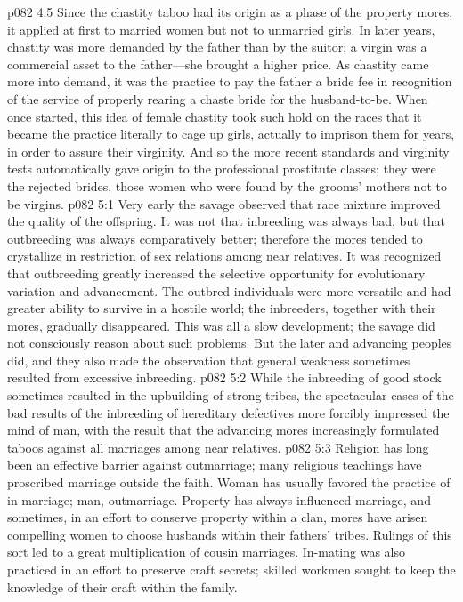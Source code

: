 \vs p082 4:5 Since the chastity taboo had its origin as a phase of the property mores, it applied at first to married women but not to unmarried girls. In later years, chastity was more demanded by the father than by the suitor; a virgin was a commercial asset to the father---she brought a higher price. As chastity came more into demand, it was the practice to pay the father a bride fee in recognition of the service of properly rearing a chaste bride for the husband\hyp{}to\hyp{}be. When once started, this idea of female chastity took such hold on the races that it became the practice literally to cage up girls, actually to imprison them for years, in order to assure their virginity. And so the more recent standards and virginity tests automatically gave origin to the professional prostitute classes; they were the rejected brides, those women who were found by the grooms’ mothers not to be virgins.
\vs p082 5:1 Very early the savage observed that race mixture improved the quality of the offspring. It was not that inbreeding was always bad, but that outbreeding was always comparatively better; therefore the mores tended to crystallize in restriction of sex relations among near relatives. It was recognized that outbreeding greatly increased the selective opportunity for evolutionary variation and advancement. The outbred individuals were more versatile and had greater ability to survive in a hostile world; the inbreeders, together with their mores, gradually disappeared. This was all a slow development; the savage did not consciously reason about such problems. But the later and advancing peoples did, and they also made the observation that general weakness sometimes resulted from excessive inbreeding.
\vs p082 5:2 While the inbreeding of good stock sometimes resulted in the upbuilding of strong tribes, the spectacular cases of the bad results of the inbreeding of hereditary defectives more forcibly impressed the mind of man, with the result that the advancing mores increasingly formulated taboos against all marriages among near relatives.
\pc \vs p082 5:3 Religion has long been an effective barrier against outmarriage; many religious teachings have proscribed marriage outside the faith. Woman has usually favored the practice of in\hyp{}marriage; man, outmarriage. Property has always influenced marriage, and sometimes, in an effort to conserve property within a clan, mores have arisen compelling women to choose husbands within their fathers’ tribes. Rulings of this sort led to a great multiplication of cousin marriages. In\hyp{}mating was also practiced in an effort to preserve craft secrets; skilled workmen sought to keep the knowledge of their craft within the family.
